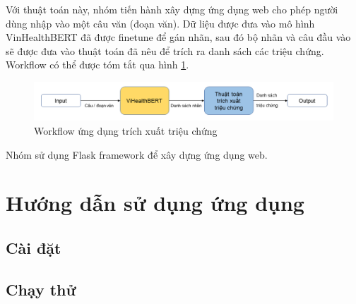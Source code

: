 \documentclass[12pt]{article}
\begin{document}
Với thuật toán này, nhóm tiến hành xây dựng ứng dụng web cho phép người dùng nhập vào một câu văn (đoạn văn). Dữ liệu được đưa vào mô hình VinHealthBERT đã được finetune để gán nhãn, sau đó bộ nhãn và câu đầu vào sẽ được đưa vào thuật toán đã nêu để trích ra danh sách các triệu chứng. Workflow có thể được tóm tắt qua hình \ref{fig:workflow}.
\begin{figure}
\centering
\includegraphics[scale=.6]{img/workflow.png}
\caption{Workflow ứng dụng trích xuất triệu chứng}
\label{fig:workflow}
\end{figure}
Nhóm sử dụng Flask framework để xây dựng ứng dụng web.

\section{Hướng dẫn sử dụng ứng dụng}
\subsection{Cài đặt}

\subsection{Chạy thử}

\cleardoublepage
{}
{}


\end{document}
